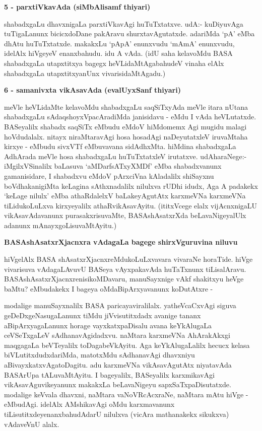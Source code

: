 \noindent
\textbf{5 - parxtiVkavAda (siMbAlisamf thiyari)}

shabadxgaLu dhavxnigaLa parxtiVkavAgi huTuTxtatxve. udA:- kuDiyuvAga tuTigaLanunx bicicxdoDane pakAravu shurxtavAgutatxde. adariMda `pA' eMba dhAtu huTuTxtatxde. makakxLu `pApA' enunxvudu `mAmA' enunxvudu, idelAlx hiVgeyeV enanxbahudu. idu A vAda. (idU saha kelavoMdu BASA shabadxgaLa utapxtitxya bagegx heVLidaMtAgabahudeV vinaha elAlx shabadxgaLa utapxtitxyanUnx vivarisidaMtAgadu.)

\noindent
\textbf{6 - samanivxta vikAsavAda (evalUyxSanf thiyari)}

meVle heVLidaMte kelavoMdu shabadxgaLu saqSiTxyAda meVle itara nUtana shabadxgaLu sAdaqshoyxVpacAradiMda janisidavu - eMdu I vAda heVLutatxde. BASeyalilx shabadx saqSiTx eMbudu eMdoV hiMdomemx Agi mugidu malagi hoVdudalalx. nitayx niraMtaravAgi hosa hosadAgi naDeyutatxleV iruvaMtaha kirxye - eMbudu sivxVTf eMbuvavana sidAdhxMta. hiMdina shabadxgaLa AdhArada meVle hosa shabadxgaLu huTuTxtatxleV irutatxve. udAharaNege:- iMgilxVSinalilx baLasuva `aMDarfsATxyXMDf' eMba shabadxvanunx gamanisidare, I shabadxvu eMdoV pArxciVna kAladalilx shiSayxnu boVdhakanigiMta keLagina sAthxnadalilx nilulxva rUDhi idudx, Aga A padakekx `keLage nilulx' eMba athaRdalelxV baLakeyAgutAtx karxmeVNa karxmeVNa tiLidukoLuLxva kirxyeyalilx athaRvikAsavAyitu. (ititxVcege elalx vijAcnxnigaLU vikAsavAdavanunx purasakxrisuvaMte, BASAshAsatxrXda beLavaNigeyalUlx adanunx mAnayxgoLisuvaMtAyitu.)

\noindent
\textbf{BASAshAsatxrXjacnxra vAdagaLa bagege shirxVguruvina niluvu}\label{page5}

hiVgelAlx BASA shAsatxrXjacnxreMdukoLuLxvavara vivaraNe horaTide. hiVge vivarisuva vAdagaLAvuvU BASeya vAyxpakavAda huTaTxnunx tiLisalAravu. BASAshAsatxrXjacnxrenisikoMDavaru, manuSayxnige vAkf shakitxyu heVge baMtu? eMbudakekx I bageya oMdaBipArxyavanunx koDutAtxre - 

modalige manuSayxnalilx BASA paricayaviralilalx. yatheVcaCxvAgi siguva geDeDxgeNasugaLanunx tiMdu jiVvisutitxdadx avanige tananx aBipArxyagaLanunx horage vayxkatxpaDisalu avana keYkAlugaLa ceVSeTxgaLeV sAdhanavAgidadxvu. naMtara karxmeVNa AhArakAkxgi maqgagaLa beVTeyalilx toDagabeVkAyitu. Aga keYkAlugaLalilx hecucx kelasa biVLutitxdudxdariMda, matotxMdu sAdhanavAgi dhavxniyu aBivayxkatxvAgatoDagitu. adu karxmeVNa vikAsavAgutAtx niyatavAda BASArUpa tALuvaMtAyitu. I bageyalilx, BASeyalilx karxmikavAgi vikAsavAguvikeyanunx makakxLa beLavaNigeyu sapxSaTxpaDisutatxde. modalige keVvala dhavxni, naMtara vaNoVRcAcxraNe, naMtara mAtu hiVge - eMbudAgi. idelAlx AMshikavAgi oMdu karxmavanunx tiLisutitxdeyenanxbahudAdarU nilulxva (vicAra mathanakekx sikukxva) vAdaveVnU alalx.

